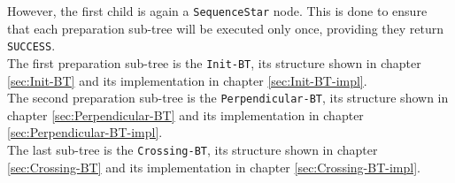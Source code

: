     However, the first child is again a \texttt{SequenceStar} node. This is done to ensure that each preparation sub-tree will be executed only once, providing they return \texttt{SUCCESS}.\\
    The first preparation sub-tree is the \texttt{Init-BT}, its structure shown in chapter \ref{sec:Init-BT} and its implementation in chapter \ref{sec:Init-BT-impl}.\\
    The second preparation sub-tree is the \texttt{Perpendicular-BT}, its structure shown in chapter \ref{sec:Perpendicular-BT} and its implementation in chapter \ref{sec:Perpendicular-BT-impl}.\\
    The last sub-tree is the \texttt{Crossing-BT}, its structure shown in chapter \ref{sec:Crossing-BT} and its implementation in chapter \ref{sec:Crossing-BT-impl}.


